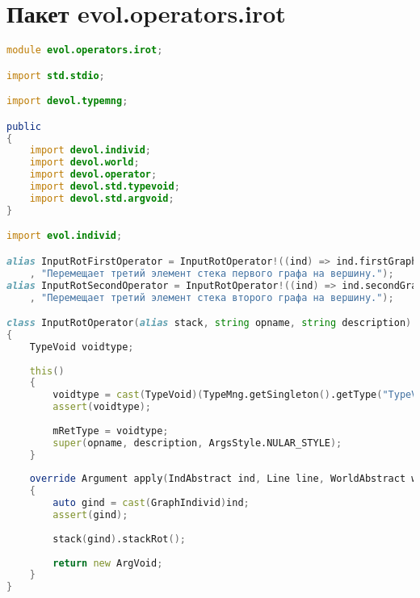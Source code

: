 \documentclass[russian,utf8,emptystyle]{eskdtext}
\begin{document}
\section{Пакет evol.operators.irot}
\begin{lstlisting}[language=D]
module evol.operators.irot;

import std.stdio;

import devol.typemng;

public
{
    import devol.individ;
    import devol.world;
    import devol.operator;
    import devol.std.typevoid;
    import devol.std.argvoid;
}

import evol.individ;

alias InputRotFirstOperator = InputRotOperator!((ind) => ind.firstGraphStack, "irot1"
    , "Перемещает третий элемент стека первого графа на вершину.");  
alias InputRotSecondOperator = InputRotOperator!((ind) => ind.secondGraphStack, "irot2"
    , "Перемещает третий элемент стека второго графа на вершину.");

class InputRotOperator(alias stack, string opname, string description) : Operator
{
    TypeVoid voidtype;
    
    this()
    {
        voidtype = cast(TypeVoid)(TypeMng.getSingleton().getType("TypeVoid"));
        assert(voidtype);
        
        mRetType = voidtype;
        super(opname, description, ArgsStyle.NULAR_STYLE);
    }
    
    override Argument apply(IndAbstract ind, Line line, WorldAbstract world)
    {
        auto gind = cast(GraphIndivid)ind;
        assert(gind);
        
        stack(gind).stackRot();
        
        return new ArgVoid;
    }   
}
\end{lstlisting}
\end{document}
